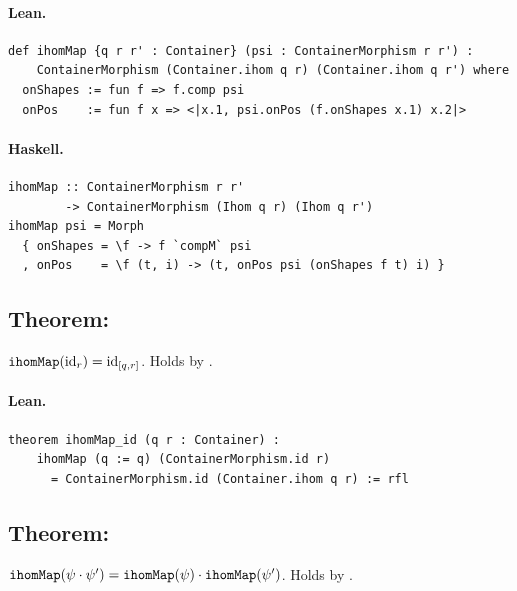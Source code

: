 \documentclass[11pt,a4paper]{article}
\begin{document}
\paragraph{Lean.}
\begin{lstlisting}[style=lean]
def ihomMap {q r r' : Container} (psi : ContainerMorphism r r') :
    ContainerMorphism (Container.ihom q r) (Container.ihom q r') where
  onShapes := fun f => f.comp psi
  onPos    := fun f x => <|x.1, psi.onPos (f.onShapes x.1) x.2|>
\end{lstlisting}

\paragraph{Haskell.}
\begin{lstlisting}[style=haskell]
ihomMap :: ContainerMorphism r r'
        -> ContainerMorphism (Ihom q r) (Ihom q r')
ihomMap psi = Morph
  { onShapes = \f -> f `compM` psi
  , onPos    = \f (t, i) -> (t, onPos psi (onShapes f t) i) }
\end{lstlisting}


\subsection{Theorem: }

\begin{thm}
$\texttt{ihomMap}(\mathrm{id}_r) = \mathrm{id}_{[q,r]}$.  Holds by .
\end{thm}

\paragraph{Lean.}
\begin{lstlisting}[style=lean]
theorem ihomMap_id (q r : Container) :
    ihomMap (q := q) (ContainerMorphism.id r)
      = ContainerMorphism.id (Container.ihom q r) := rfl
\end{lstlisting}


\subsection{Theorem: }

\begin{thm}
$\texttt{ihomMap}(\psi \cdot \psi') = \texttt{ihomMap}(\psi) \cdot \texttt{ihomMap}(\psi')$.
Holds by .
\end{thm}
\end{document}
